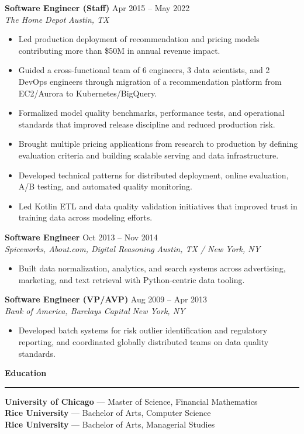 \documentclass[10pt,letterpaper]{article}
\newenvironment{tightitemize}{%
  \begin{itemize}
    \setlength{\itemsep}{2pt}
    \setlength{\topsep}{2pt}
    \setlength{\parsep}{0pt}
    \setlength{\partopsep}{0pt}
}{%
  \end{itemize}
}
\newcommand{\sectiontitle}[1]{%
  \vspace{0.6em}
  {\large \textbf{#1}}\par
  \vspace{0.15em}
  \hrule
  \vspace{0.35em}
}
\newcommand{\roleheading}[4]{%
  \textbf{#1} \hfill #2\\
  \textit{#3} \hfill \textit{#4}\par
  \vspace{0.15em}
}
\begin{document}
\roleheading{Software Engineer (Staff)}{Apr 2015 -- May 2022}{The Home Depot}{Austin, TX}
\begin{tightitemize}
  \item Led production deployment of recommendation and pricing models contributing more than \$50M in annual revenue impact.
  \item Guided a cross-functional team of 6 engineers, 3 data scientists, and 2 DevOps engineers through migration of a recommendation platform from EC2/Aurora to Kubernetes/BigQuery.
  \item Formalized model quality benchmarks, performance tests, and operational standards that improved release discipline and reduced production risk.
  \item Brought multiple pricing applications from research to production by defining evaluation criteria and building scalable serving and data infrastructure.
  \item Developed technical patterns for distributed deployment, online evaluation, A/B testing, and automated quality monitoring.
  \item Led Kotlin ETL and data quality validation initiatives that improved trust in training data across modeling efforts.
\end{tightitemize}

\roleheading{Software Engineer}{Oct 2013 -- Nov 2014}{Spiceworks, About.com, Digital Reasoning}{Austin, TX / New York, NY}
\begin{tightitemize}
  \item Built data normalization, analytics, and search systems across advertising, marketing, and text retrieval with Python-centric data tooling.
\end{tightitemize}

\roleheading{Software Engineer (VP/AVP)}{Aug 2009 -- Apr 2013}{Bank of America, Barclays Capital}{New York, NY}
\begin{tightitemize}
  \item Developed batch systems for risk outlier identification and regulatory reporting, and coordinated globally distributed teams on data quality standards.
\end{tightitemize}

\sectiontitle{Education}
\textbf{University of Chicago} --- Master of Science, Financial Mathematics\\
\textbf{Rice University} --- Bachelor of Arts, Computer Science\\
\textbf{Rice University} --- Bachelor of Arts, Managerial Studies
\end{document}
